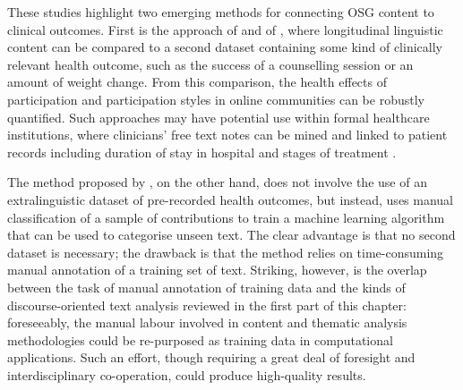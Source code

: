 

These studies highlight two emerging methods for connecting \gls{OSG} content to clinical outcomes. First is the approach of \textcite{yan2015good} and of \textcite{althoff_counseling_2016}, where longitudinal linguistic content can be compared to a second dataset containing some kind of clinically relevant health outcome, such as the success of a counselling session or an amount of weight change. From this comparison, the health effects of participation and participation styles in online communities can be robustly quantified. Such approaches may have potential use within formal healthcare institutions, where clinicians' free text notes can be mined and linked to patient records including duration of stay in hospital and stages of treatment \cite{elkin_nlp-based_2008,miller_discovering_2013}.

The method proposed by \textcite{maclean_forum77:_2015}, on the other hand, does not involve the use of an extralinguistic dataset of pre\hyp{}recorded health outcomes, but instead, uses manual classification of a sample of contributions to train a machine learning algorithm that can be used to categorise unseen text. The clear advantage is that no second dataset is necessary; the drawback is that the method relies on time\hyp{}consuming manual annotation of a training set of text. Striking, however, is the overlap between the task of manual annotation of training data and the kinds of discourse\hyp{}oriented text analysis reviewed in the first part of this chapter: foreseeably, the manual labour involved in content and thematic analysis methodologies could be re\hyp{}purposed as training data in computational applications. Such an effort, though requiring a great deal of foresight and interdisciplinary co\hyp{}operation, could produce high\hyp{}quality results.




